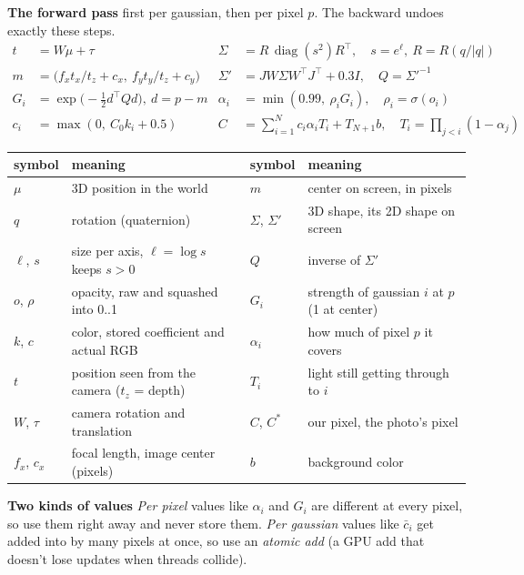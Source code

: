 \documentclass[11pt]{article}
\newcommand{\T}{^{\top}}
\newcommand{\diag}{\operatorname{diag}}
\newcommand{\lbl}[1]{\textbf{#1}\quad}
\begin{document}
\lbl{The forward pass} first per gaussian, then per pixel $p$. The backward undoes exactly these steps.
\begin{align*}
t &= W\mu + \tau & \Sigma &= R\,\diag(s^2)R\T,\quad s = e^{\ell},\ R = R(q/|q|) \\
m &= \bigl(f_x t_x/t_z + c_x,\ f_y t_y/t_z + c_y\bigr) & \Sigma' &= J W \Sigma W\T J\T + 0.3I,\quad Q = \Sigma'^{-1} \\
G_i &= \exp\bigl(-\tfrac12 d\T Q d\bigr),\ d = p - m & \alpha_i &= \min(0.99,\ \rho_i G_i),\quad \rho_i = \sigma(o_i) \\
c_i &= \max(0,\ C_0 k_i + 0.5) & C &= \textstyle\sum_{i=1}^{N} c_i \alpha_i T_i + T_{N+1} b,\quad T_i = \prod_{j<i}(1-\alpha_j)
\end{align*}

\begin{center}
\small
\begin{tabular}{@{}ll@{\qquad}ll@{}}
\toprule
symbol & meaning & symbol & meaning \\
\midrule
$\mu$ & 3D position in the world & $m$ & center on screen, in pixels \\
$q$ & rotation (quaternion) & $\Sigma$, $\Sigma'$ & 3D shape, its 2D shape on screen \\
$\ell$, $s$ & size per axis, $\ell = \log s$ keeps $s > 0$ & $Q$ & inverse of $\Sigma'$ \\
$o$, $\rho$ & opacity, raw and squashed into 0..1 & $G_i$ & strength of gaussian $i$ at $p$ (1 at center) \\
$k$, $c$ & color, stored coefficient and actual RGB & $\alpha_i$ & how much of pixel $p$ it covers \\
$t$ & position seen from the camera ($t_z$ = depth) & $T_i$ & light still getting through to $i$ \\
$W$, $\tau$ & camera rotation and translation & $C$, $C^*$ & our pixel, the photo's pixel \\
$f_x$, $c_x$ & focal length, image center (pixels) & $b$ & background color \\
\bottomrule
\end{tabular}
\end{center}

\lbl{Two kinds of values} \emph{Per pixel} values like $\alpha_i$ and $G_i$ are different at every pixel, so use them right away and never store them. \emph{Per gaussian} values like $\bar c_i$ get added into by many pixels at once, so use an \emph{atomic add} (a GPU add that doesn't lose updates when threads collide).
\end{document}
